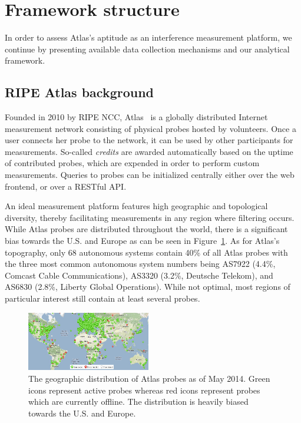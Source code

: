 \section{Framework structure}
\label{sec:framework}
In order to assess Atlas's aptitude as an interference measurement platform, we
continue by presenting available data collection mechanisms and our analytical framework.

\subsection{RIPE Atlas background}
Founded in 2010 by RIPE NCC, Atlas~\cite{atlas} is a globally
distributed Internet measurement network consisting of physical probes hosted
by volunteers.  Once a user connects her probe to the network, it can be used
by other participants for measurements. So-called \emph{credits} are awarded
automatically based on the uptime of contributed probes, which are expended in
order to perform custom measurements. Queries to probes can be initialized
centrally either over the web frontend, or over a RESTful API.

An ideal measurement platform features high geographic and
topological diversity, thereby facilitating measurements in any region where
filtering occurs.  While Atlas probes are distributed throughout the world,
there is a significant bias towards the U.S. and Europe as can be seen in
Figure~\ref{fig:probe_distribution}.  As for Atlas's topography, only 68
autonomous systems contain 40\% of all Atlas probes with the three most common
autonomous system numbers being AS7922 (4.4\%, Comcast Cable Communications),
AS3320 (3.2\%, Deutsche Telekom), and AS6830 (2.8\%, Liberty Global Operations).
While not optimal, most regions of particular interest still contain at least several
probes.

\begin{figure}[t]
\centering
\includegraphics[width=0.48\textwidth]{diagrams/probe_distribution.jpg}
\caption{The geographic distribution of Atlas probes as of May 2014.  Green
icons represent active probes whereas red icons represent probes which are
currently offline.  The distribution is heavily biased towards the U.S. and
Europe.} \label{fig:probe_distribution}
\end{figure}

